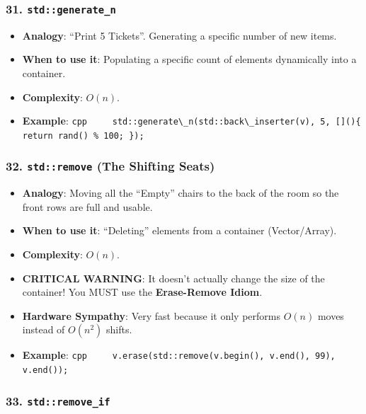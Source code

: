 \hypertarget{stdgenerate_n}{%
\subsubsection{\texorpdfstring{31.
\texttt{std::generate\_n}}{31. std::generate\_n}}\label{stdgenerate_n}}

\begin{itemize}
\tightlist
\item
  \textbf{Analogy}: ``Print 5 Tickets''. Generating a specific number of
  new items.
\item
  \textbf{When to use it}: Populating a specific count of elements
  dynamically into a container.
\item
  \textbf{Complexity}: \(O(n)\).
\item
  \textbf{Example}:
  \passthrough{\lstinline!cpp     std::generate\_n(std::back\_inserter(v), 5, []()\{ return rand() \% 100; \});!}
\end{itemize}

\hypertarget{stdremove-the-shifting-seats}{%
\subsubsection{\texorpdfstring{32. \texttt{std::remove} (The Shifting
Seats)}{32. std::remove (The Shifting Seats)}}\label{stdremove-the-shifting-seats}}

\begin{itemize}
\tightlist
\item
  \textbf{Analogy}: Moving all the ``Empty'' chairs to the back of the
  room so the front rows are full and usable.
\item
  \textbf{When to use it}: ``Deleting'' elements from a container
  (Vector/Array).
\item
  \textbf{Complexity}: \(O(n)\).
\item
  \textbf{CRITICAL WARNING}: It doesn't actually change the size of the
  container! You MUST use the \textbf{Erase-Remove Idiom}.
\item
  \textbf{Hardware Sympathy}: Very fast because it only performs
  \(O(n)\) moves instead of \(O(n^2)\) shifts.
\item
  \textbf{Example}:
  \passthrough{\lstinline!cpp     v.erase(std::remove(v.begin(), v.end(), 99), v.end());!}
\end{itemize}

\hypertarget{stdremove_if}{%
\subsubsection{\texorpdfstring{33.
\texttt{std::remove\_if}}{33. std::remove\_if}}\label{stdremove_if}}

